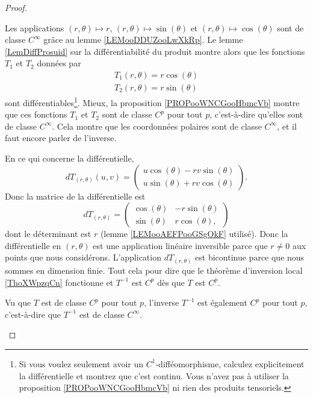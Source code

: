 \begin{proof}
\begin{enumerate}
                Les applications \( (r,\theta)\mapsto r\), \( (r,\theta)\mapsto \sin(\theta)\) et \( (r,\theta)\mapsto \cos(\theta)\) sont de classe \(  C^{\infty}\) grâce au lemme \ref{LEMooDDUZooLwXkRp}. Le lemme \ref{LemDiffProsuid} sur la différentiabilité du produit montre alors que les fonctions \( T_1\) et \( T_2\) données par
                \begin{subequations}
                    \begin{align}
                        T_1(r,\theta)=r\cos(\theta)\\
                        T_2(r,\theta)=r\sin(\theta)
                    \end{align}
                \end{subequations}
                sont différentiables\footnote{Si vous voulez seulement avoir un \( C^1\)-difféomorphisme, calculez explicitement la différentielle et montrez que c'est continu. Vous n'avez pas à utiliser la proposition \ref{PROPooWNCGooHbmcVb} ni rien des produits tensoriels.}. Mieux, la proposition \ref{PROPooWNCGooHbmcVb} montre que ces fonctions \( T_1\) et \( T_2\) sont de classe \( C^p\) pour tout \( p\), c'est-à-dire qu'elles sont de classe \(  C^{\infty}\). Cela montre que les coordonnées polaires sont de classe \(  C^{\infty}\), et il faut encore parler de l'inverse.

                En ce qui concerne la différentielle,
                \begin{equation}
                    dT_{(r,\theta)}(u,v)=\begin{pmatrix}
                        u\cos(\theta)-rv\sin(\theta)    \\ 
                        u\sin(\theta)+rv\cos(\theta)    
                    \end{pmatrix}.
                \end{equation}
                Donc la matrice de la différentielle est
                \begin{equation}
                    dT_{(r,\theta)}=\begin{pmatrix}
                        \cos(\theta)    &  -r\sin(\theta)    \\ 
                        \sin(\theta)    &   r\cos(\theta),    
                    \end{pmatrix}
                \end{equation}
                dont le déterminant est \( r\) (lemme \ref{LEMooAEFPooGSgOkF} utilisé). Donc la différentielle en \( (r,\theta)\) est une application linéaire inversible parce que \( r\neq 0\) aux points que nous considérons. L'application \( dT_{(r,\theta)}\) est bicontinue parce que nous sommes en dimension finie. Tout cela pour dire que le théorème d'inversion local \ref{ThoXWpzqCn} fonctionne et \( T^{-1}\) est \( C^p\) dès que \( T\) est \( C^p\). 

                Vu que \( T\) est de classe \( C^p\) pour tout \( p\), l'inverse \( T^{-1}\) est également \( C^p\) pour tout \( p\), c'est-à-dire que \( T^{-1}\) est de classe \(  C^{\infty}\).
    \end{enumerate}
\end{proof}

